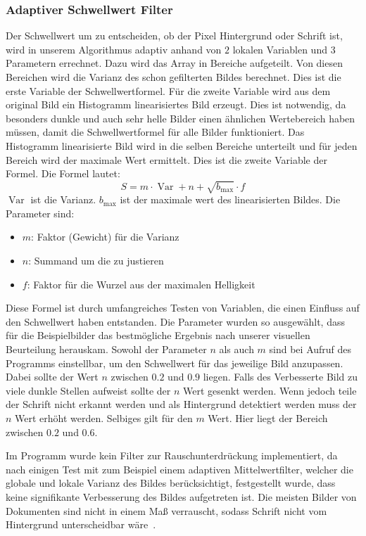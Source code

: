 \documentclass[sigconf]{acmart}
\newcommand{\Var}{\operatorname{Var}}
\begin{document}
\subsubsection{Adaptiver Schwellwert Filter}
Der Schwellwert um zu entscheiden, ob der Pixel Hintergrund oder
Schrift ist, wird in unserem Algorithmus adaptiv anhand von $2$
lokalen Variablen und $3$ Parametern errechnet. Dazu wird das Array in
Bereiche aufgeteilt. Von diesen Bereichen wird die Varianz des schon
gefilterten Bildes berechnet. Dies ist die erste Variable der
Schwellwertformel. Für die zweite Variable wird aus dem original Bild
ein Histogramm linearisiertes Bild erzeugt.  Dies ist notwendig, da
besonders dunkle und auch sehr helle Bilder einen ähnlichen
Wertebereich haben müssen, damit die Schwellwertformel für alle Bilder
funktioniert. Das Histogramm linearisierte Bild wird in die selben
Bereiche unterteilt und für jeden Bereich wird der maximale Wert
ermittelt. Dies ist die zweite Variable der Formel.  Die Formel
lautet:
\begin{equation}
  S = m \cdot \Var + n + \sqrt{b_{\max}} \cdot f
\end{equation}
$\Var$ ist die Varianz. $b_{\max}$ ist der maximale wert des
linearisierten Bildes.  Die Parameter sind:

\begin{itemize}
\item $m$: Faktor (Gewicht) für die Varianz
\item $n$: Summand um die zu justieren
\item $f$: Faktor für die Wurzel aus der maximalen Helligkeit
\end{itemize}

Diese Formel ist durch umfangreiches Testen von Variablen, die einen Einfluss
auf den Schwellwert haben entstanden. Die Parameter wurden so
ausgewählt, dass für die Beispielbilder das bestmögliche Ergebnis nach
unserer visuellen Beurteilung herauskam.  Sowohl der Parameter $n$ als
auch $m$ sind bei Aufruf des Programms einstellbar, um den Schwellwert
für das jeweilige Bild anzupassen. Dabei sollte der Wert $n$ zwischen
$0.2$ und $0.9$ liegen. Falls des Verbesserte Bild zu viele dunkle
Stellen aufweist sollte der $n$ Wert gesenkt werden. Wenn jedoch teile
der Schrift nicht erkannt werden und als Hintergrund detektiert werden
muss der $n$ Wert erhöht werden. Selbiges gilt für den $m$ Wert.  Hier
liegt der Bereich zwischen $0.2$ und $0.6$.

Im Programm wurde kein Filter zur Rauschunterdrückung implementiert,
da nach einigen Test mit zum Beispiel einem adaptiven
Mittelwertfilter, welcher die globale und lokale Varianz des Bildes
berücksichtigt, festgestellt wurde, dass keine signifikante
Verbesserung des Bildes aufgetreten ist. Die meisten Bilder von
Dokumenten sind nicht in einem Maß verrauscht, sodass Schrift nicht
vom Hintergrund unterscheidbar wäre~\cite{denzler2021}.
\end{document}
